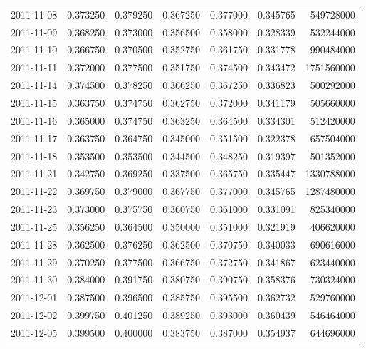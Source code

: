 \begin{tabular}{lrrrrrr}
2011-11-08 &    0.373250 &    0.379250 &    0.367250 &    0.377000 &    0.345765 &   549728000 \\
2011-11-09 &    0.368250 &    0.373000 &    0.356500 &    0.358000 &    0.328339 &   532244000 \\
2011-11-10 &    0.366750 &    0.370500 &    0.352750 &    0.361750 &    0.331778 &   990484000 \\
2011-11-11 &    0.372000 &    0.377500 &    0.351750 &    0.374500 &    0.343472 &  1751560000 \\
2011-11-14 &    0.374500 &    0.378250 &    0.366250 &    0.367250 &    0.336823 &   500292000 \\
2011-11-15 &    0.363750 &    0.374750 &    0.362750 &    0.372000 &    0.341179 &   505660000 \\
2011-11-16 &    0.365000 &    0.374750 &    0.363250 &    0.364500 &    0.334301 &   512420000 \\
2011-11-17 &    0.363750 &    0.364750 &    0.345000 &    0.351500 &    0.322378 &   657504000 \\
2011-11-18 &    0.353500 &    0.353500 &    0.344500 &    0.348250 &    0.319397 &   501352000 \\
2011-11-21 &    0.342750 &    0.369250 &    0.337500 &    0.365750 &    0.335447 &  1330788000 \\
2011-11-22 &    0.369750 &    0.379000 &    0.367750 &    0.377000 &    0.345765 &  1287480000 \\
2011-11-23 &    0.373000 &    0.375750 &    0.360750 &    0.361000 &    0.331091 &   825340000 \\
2011-11-25 &    0.356250 &    0.364500 &    0.350000 &    0.351000 &    0.321919 &   406620000 \\
2011-11-28 &    0.362500 &    0.376250 &    0.362500 &    0.370750 &    0.340033 &   690616000 \\
2011-11-29 &    0.370250 &    0.377500 &    0.366750 &    0.372750 &    0.341867 &   623440000 \\
2011-11-30 &    0.384000 &    0.391750 &    0.380750 &    0.390750 &    0.358376 &   730324000 \\
2011-12-01 &    0.387500 &    0.396500 &    0.385750 &    0.395500 &    0.362732 &   529760000 \\
2011-12-02 &    0.399750 &    0.401250 &    0.389250 &    0.393000 &    0.360439 &   546464000 \\
2011-12-05 &    0.399500 &    0.400000 &    0.383750 &    0.387000 &    0.354937 &   644696000 \\

\end{tabular}
